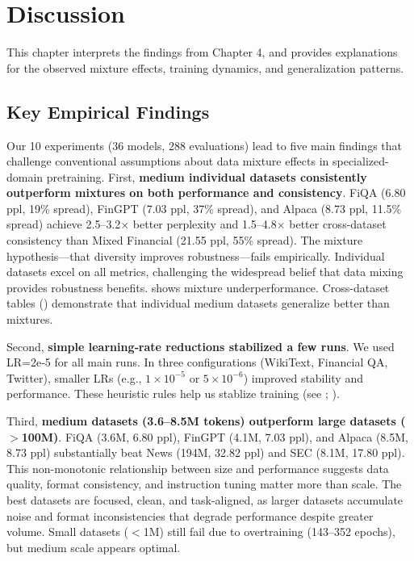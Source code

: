 \chapter{Discussion}

This chapter interprets the findings from Chapter 4, and provides explanations for the observed mixture effects, training dynamics, and generalization patterns.

\section{Key Empirical Findings}

Our 10 experiments (36 models, 288 evaluations) lead to five main findings that challenge conventional assumptions about data mixture effects in specialized-domain pretraining. First, \textbf{medium individual datasets consistently outperform mixtures on both performance and consistency}. FiQA (6.80 ppl, 19\% spread), FinGPT (7.03 ppl, 37\% spread), and Alpaca (8.73 ppl, 11.5\% spread) achieve 2.5–3.2$\times$ better perplexity and 1.5–4.8$\times$ better cross-dataset consistency than Mixed Financial (21.55 ppl, 55\% spread). The mixture hypothesis—that diversity improves robustness—fails empirically. Individual datasets excel on all metrics, challenging the widespread belief that data mixing provides robustness benefits.  shows mixture underperformance. Cross-dataset tables () demonstrate that individual medium datasets generalize better than mixtures.

Second, \textbf{simple learning‑rate reductions stabilized a few runs}. We used LR=2e‑5 for all main runs. In three configurations (WikiText, Financial QA, Twitter), smaller LRs (e.g., $1\times10^{-5}$ or $5\times10^{-6}$) improved stability and performance. These heuristic rules help us stablize training (see ; ).

Third, \textbf{medium datasets (3.6–8.5M tokens) outperform large datasets ($>$100M)}. FiQA (3.6M, 6.80 ppl), FinGPT (4.1M, 7.03 ppl), and Alpaca (8.5M, 8.73 ppl) substantially beat News (194M, 32.82 ppl) and SEC (8.1M, 17.80 ppl). This non-monotonic relationship between size and performance suggests data quality, format consistency, and instruction tuning matter more than scale. The best datasets are focused, clean, and task-aligned, as larger datasets accumulate noise and format inconsistencies that degrade performance despite greater volume. Small datasets ($<$1M) still fail due to overtraining (143–352 epochs), but medium scale appears optimal.

